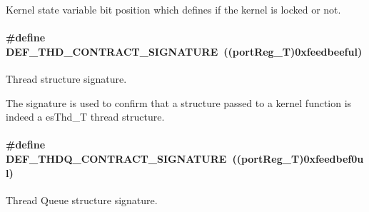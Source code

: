 Kernel state variable bit position which defines if the kernel is locked or not. 

\hypertarget{group__kern__impl_ga19da32f7a4f44e5a4bddb5a588d73677}{
\paragraph[{D\-E\-F\-\_\-\-T\-H\-D\-\_\-\-C\-O\-N\-T\-R\-A\-C\-T\-\_\-\-S\-I\-G\-N\-A\-T\-U\-R\-E}]{\setlength{\rightskip}{0pt plus 5cm}\#define D\-E\-F\-\_\-\-T\-H\-D\-\_\-\-C\-O\-N\-T\-R\-A\-C\-T\-\_\-\-S\-I\-G\-N\-A\-T\-U\-R\-E~((port\-Reg\-\_\-\-T)0xfeedbeeful)}}\label{group__kern__impl_ga19da32f7a4f44e5a4bddb5a588d73677}


Thread structure signature. 

The signature is used to confirm that a structure passed to a kernel function is indeed a es\-Thd\-\_\-\-T thread structure. \hypertarget{group__kern__impl_ga7f087a59efb2fe7078a7479aa674b7b4}{
\paragraph[{D\-E\-F\-\_\-\-T\-H\-D\-Q\-\_\-\-C\-O\-N\-T\-R\-A\-C\-T\-\_\-\-S\-I\-G\-N\-A\-T\-U\-R\-E}]{\setlength{\rightskip}{0pt plus 5cm}\#define D\-E\-F\-\_\-\-T\-H\-D\-Q\-\_\-\-C\-O\-N\-T\-R\-A\-C\-T\-\_\-\-S\-I\-G\-N\-A\-T\-U\-R\-E~((port\-Reg\-\_\-\-T)0xfeedbef0ul)}}\label{group__kern__impl_ga7f087a59efb2fe7078a7479aa674b7b4}


Thread Queue structure signature. 

